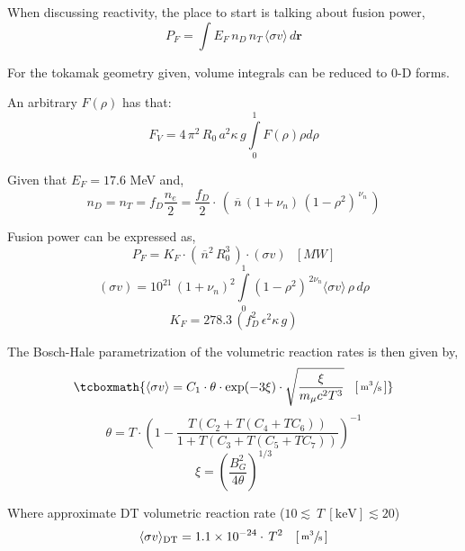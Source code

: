 When discussing reactivity, the place to start is talking about fusion power,
\begin{equation}
	P_F = \int E_F \, n_D \, n_T \, \langle \sigma v \rangle \, d \textbf{r}
\end{equation}

For the tokamak geometry given, volume integrals can be reduced to 0-D forms. 

An arbitrary $F(\rho)$ has that:
\begin{equation}
	F_V = 4 \, \pi ^2 \, R_0 \, a^2 \kappa \, g \int\limits_0^1 F(\rho) \rho d\rho
\end{equation}

Given that $E_F = 17.6$ MeV and,
\begin{equation}
	n_D = n_T = f_D \frac {n_e}{2} = \frac{f_D}{2} \cdot \, \left( \ \overline{n} \, ( 1 + \nu_n ) \, ( 1 - \rho^2 ) ^ {\, \nu_n} \, \right) 
\end{equation}

Fusion power can be expressed as,
\begin{equation}
	P_F = K_F \cdot ( \, \overline{n}^2 \, R_0^3 \, ) \cdot (\sigma v) \ \ \ [MW]
\end{equation}
\begin{equation}
	 (\sigma v) = 10^{21} \, (1+\nu_n)^2 \int\limits_0^1 ( 1 - \rho^2 ) ^ { \, 2 \nu_n} \langle \sigma v \rangle \, \rho \, d\rho
\end{equation}
\begin{equation}
	K_F = 278.3 \, ( f_D^2 \, \epsilon^2 \kappa \, g )
\end{equation}

The Bosch-Hale parametrization of the volumetric reaction rates is then given by, \cite{boschhale,zach}
\begin{equation}
	\tcboxmath{
	\langle \sigma v \rangle = C_1 \cdot \theta \cdot \textnormal{exp}(-3 \xi) \cdot \sqrt{ \frac{\xi  }{m_\mu  c^2 T^3} }  \ \ \, [ \, \sfrac{ \textnormal{m}^3 }{ \textnormal{s} } \, ] }
\end{equation}
\begin{equation} 
	\theta = T \cdot \left(1-\frac{T(C_2+T(C_4+TC_6))}{1+T(C_3+T(C_5+TC_7))}\right) ^{-1}
\end{equation}
\begin{equation}
	\xi = \left(\frac{B_G^2}{4\theta}\right)^{1/3}
\end{equation}

Where approximate DT volumetric reaction rate ($10\lesssim~T~\mathrm{[keV]}\lesssim20$)
\begin{equation}
		\langle\sigma v\rangle_\mathrm{DT} = 1.1\times10^{-24} \cdot  \, T^2   \ \ \ [ \, \sfrac{ \textnormal{m}^3 }{ \textnormal{s} } \, ]
\end{equation}

